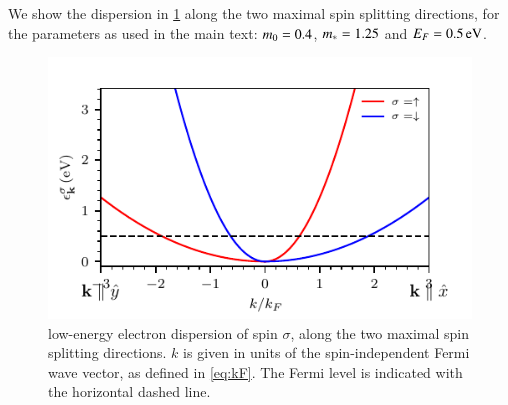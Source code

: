 \documentclass[aps,prb,reprint,twocolumns,superscriptaddress,nofootinbib]{revtex4-2}
\begin{document}
	We show the dispersion in \cref{fig:dispersion} along the two maximal spin splitting directions, for the parameters as used in the main text: $m_0=0.4$, $m_*=1.25$ and $E_F=\SI{0.5}{eV}$.
		\begin{figure}
		\centering
		\includegraphics{dispersion}
		\caption{low-energy electron dispersion of spin $\sigma$, along the two maximal spin splitting directions. $k$ is given in units of the spin-independent Fermi wave vector, as defined in \cref{eq:kF}. The Fermi level is indicated with the horizontal dashed line. \label{fig:dispersion}} 
	\end{figure}
	
\end{document}
